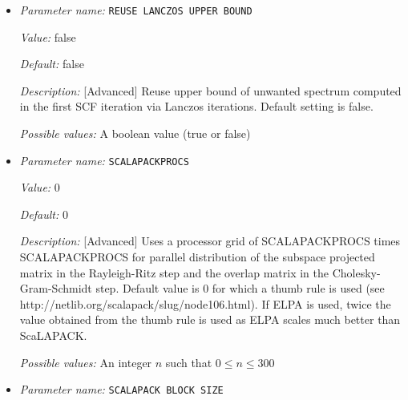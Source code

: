 \begin{itemize}
{\it Value:} false


{\it Default:} false


{\it Description:} [Advanced] Restrict to single chebyshev filter pass in each SCF. This setting is only used for timing measurements of stable single SCF iteration.


{\it Possible values:} A boolean value (true or false)
\item {\it Parameter name:} {\tt REUSE LANCZOS UPPER BOUND}
\label{parameters:SCF parameters/Eigen_2dsolver parameters/REUSE LANCZOS UPPER BOUND}
\label{parameters:SCF_20parameters/Eigen_2dsolver_20parameters/REUSE_20LANCZOS_20UPPER_20BOUND}


{\it Value:} false


{\it Default:} false


{\it Description:} [Advanced] Reuse upper bound of unwanted spectrum computed in the first SCF iteration via Lanczos iterations. Default setting is false.


{\it Possible values:} A boolean value (true or false)
\item {\it Parameter name:} {\tt SCALAPACKPROCS}
\label{parameters:SCF parameters/Eigen_2dsolver parameters/SCALAPACKPROCS}
\label{parameters:SCF_20parameters/Eigen_2dsolver_20parameters/SCALAPACKPROCS}


{\it Value:} 0


{\it Default:} 0


{\it Description:} [Advanced] Uses a processor grid of SCALAPACKPROCS times SCALAPACKPROCS for parallel distribution of the subspace projected matrix in the Rayleigh-Ritz step and the overlap matrix in the Cholesky-Gram-Schmidt step. Default value is 0 for which a thumb rule is used (see http://netlib.org/scalapack/slug/node106.html). If ELPA is used, twice the value obtained from the thumb rule is used as ELPA scales much better than ScaLAPACK.


{\it Possible values:} An integer $n$ such that $0\leq n \leq 300$
\item {\it Parameter name:} {\tt SCALAPACK BLOCK SIZE}
\label{parameters:SCF parameters/Eigen_2dsolver parameters/SCALAPACK BLOCK SIZE}
\label{parameters:SCF_20parameters/Eigen_2dsolver_20parameters/SCALAPACK_20BLOCK_20SIZE}



\end{itemize}
